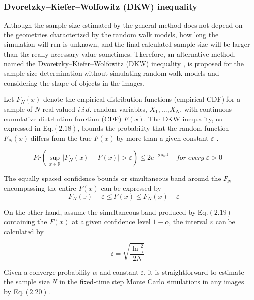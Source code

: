 \subsubsection{Dvoretzky–Kiefer–Wolfowitz (DKW) inequality}

Although the sample size estimated by the general method does not
depend on the geometries characterized by the random walk models, how
long the simulation will run is unknown, and the final calculated
sample size will be larger than the really necessary value
sometimes. Therefore, an alternative method, named the
Dvoretzky–Kiefer–Wolfowitz (DKW) inequality
\cite{dvoretzky1956asymptotic}, is proposed for the sample size
determination without simulating random walk models and considering
the shape of objects in the images.

Let $F_N(x)$ denote the empirical distribution functions (empirical
CDF) for a sample of $N$ real-valued $i.i.d.$ random variables,
$X_{1}, ... , X_{N}$, with continuous cumulative distrbution function
(CDF) $F(x)$. The DKW inequality, as expressed in Eq.$(2.18)$, bounds the
probability that the random function $F_{N}(x)$ differs from the true
$F(x)$ by more than a given constant $\varepsilon$
\cite{dvoretzky1956asymptotic}.

\begin{equation}
  Pr(\sup_{x \in \mathbb{R}} |F_{N}(x) - F(x)| > \varepsilon) \leq
  2e^{-2N\varepsilon^2} \;\; \;\; for \; every \; \varepsilon > 0
\end{equation}

The equally spaced confidence bounds or simultaneous band around the
$F_{N}$ encompassing the entire $F(x)$ can be expressed by
\begin{equation}
  F_{N}(x) - \varepsilon \leq F(x) \leq F_N(x) + \varepsilon \; \; \; \; 
\end{equation}

On the other hand, assume the simultaneous band produced by Eq.$(2.19)$
containing the $F(x)$ at a given confidence level $1-\alpha$, the
interval $\varepsilon$ can be calculated by

\begin{equation}
  \varepsilon = \sqrt{\frac{\ln{\frac{2}{\alpha}}}{2N}}
\end{equation}


Given a converge probability $\alpha$ and constant $\varepsilon$, it is
straightforward to estimate the sample size $N$ in the fixed-time step
Monte Carlo simulations in any images by Eq.$(2.20)$.


